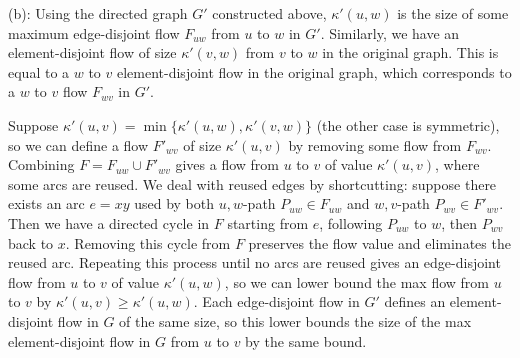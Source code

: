 \documentclass[11pt,letterpaper]{article}
\theoremstyle{definition}
\begin{document}
(b): Using the directed graph $G'$ constructed above, $\kappa'(u,w)$ is the size of some maximum edge-disjoint flow $F_{uw}$ from $u$ to $w$ in $G'$.
Similarly, we have an element-disjoint flow of size $\kappa'(v,w)$ from $v$ to $w$ in the original graph. This is equal to a $w$ to $v$ element-disjoint flow in the original graph, which corresponds to a $w$ to $v$ flow $F_{wv}$ in $G'$.


Suppose $\kappa'(u,v) = \min\{\kappa'(u,w),\kappa'(v,w)\}$ (the other case is symmetric), so we can define a flow $F'_{wv}$ of size $\kappa'(u,v)$ by removing some flow from $F_{wv}$.
Combining $F = F_{uw}\cup F'_{wv}$ gives a flow from $u$ to $v$ of value $\kappa'(u,v)$, where some arcs are reused.
We deal with reused edges by shortcutting:
suppose there exists an arc $e=xy$ used by both $u,w$-path $P_{uw}\in F_{uw}$ and $w,v$-path $P_{wv}\in F'_{wv}$.
Then we have a directed cycle in $F$ starting from $e$, following $P_{uw}$ to $w$, then $P_{wv}$ back to $x$.
Removing this cycle from $F$ preserves the flow value and eliminates the reused arc.
Repeating this process until no arcs are reused gives an edge-disjoint flow from $u$ to $v$ of value $\kappa'(u,w)$, so we can lower bound the max flow from $u$ to $v$ by $\kappa'(u,v)\geq\kappa'(u,w)$.
Each edge-disjoint flow in $G'$ defines an element-disjoint flow in $G$ of the same size, so this lower bounds the size of the max element-disjoint flow in $G$ from $u$ to $v$ by the same bound.
\end{document}
